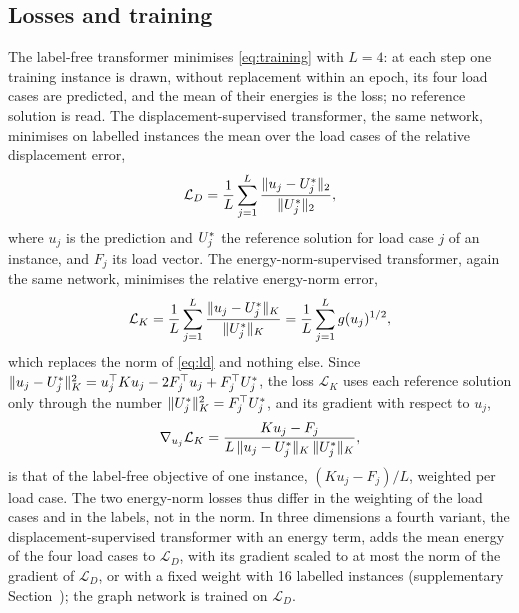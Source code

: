 \subsection{Losses and training}\label{sec:methods:training}

The label-free transformer minimises \eqref{eq:training} with $L=4$: at each step one
training instance is drawn, without replacement within an epoch, its four load cases are
predicted, and the mean of their energies is the loss; no reference solution is read. The
displacement-supervised transformer, the same network, minimises on labelled instances the
mean over the load cases of the relative displacement error,
\begin{equation}
\mathcal{L}_D=\frac{1}{L}\sum_{j=1}^{L}\frac{\lVert u_j-U^{\ast}_j\rVert_2}{\lVert U^{\ast}_j\rVert_2},
\label{eq:ld}
\end{equation}
where $u_j$ is the prediction and $U^{\ast}_j$ the reference solution for load case $j$ of an
instance, and $F_j$ its load vector. The energy-norm-supervised transformer, again the same
network, minimises the relative energy-norm error,
\begin{equation}
\mathcal{L}_K=\frac{1}{L}\sum_{j=1}^{L}\frac{\lVert u_j-U^{\ast}_j\rVert_K}{\lVert U^{\ast}_j\rVert_K}
=\frac{1}{L}\sum_{j=1}^{L}g(u_j)^{1/2},
\label{eq:lk}
\end{equation}
which replaces the norm of \eqref{eq:ld} and nothing else. Since
$\lVert u_j-U^{\ast}_j\rVert_K^2=u_j^{\top}Ku_j-2F_j^{\top}u_j+F_j^{\top}U^{\ast}_j$, the loss
$\mathcal{L}_K$ uses each reference solution only through the number
$\lVert U^{\ast}_j\rVert_K^2=F_j^{\top}U^{\ast}_j$, and its gradient with respect to $u_j$,
\begin{equation}
\nabla_{u_j}\mathcal{L}_K=\frac{Ku_j-F_j}{L\,\lVert u_j-U^{\ast}_j\rVert_K\,\lVert U^{\ast}_j\rVert_K},
\label{eq:lkgrad}
\end{equation}
is that of the label-free objective of one instance, $(Ku_j-F_j)/L$, weighted per load case.
The two energy-norm losses thus differ in the weighting of the load cases and in the labels,
not in the norm. In three dimensions a fourth variant, the displacement-supervised
transformer with an energy term, adds the mean energy of the four load cases to
$\mathcal{L}_D$, with its gradient scaled to at most the norm of the gradient of
$\mathcal{L}_D$, or with a fixed weight with 16 labelled instances (supplementary
Section~\SuppPrereg); the graph network is trained on $\mathcal{L}_D$.

